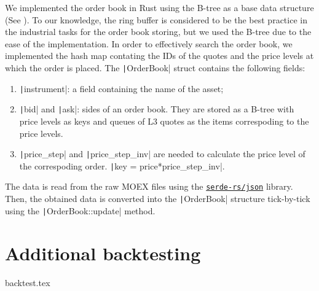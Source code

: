 \begin{appendices}
        We implemented the order book in Rust using the B-tree as a base data structure (See \Cite{Cormen2022}). To our knowledge, 
        the ring buffer is considered to be the best practice in the industrial tasks for the order book storing, but we used 
        the B-tree due to the ease of the implementation.
        In order to effectively search the order book, we implemented the hash map contating the IDs of the quotes and
        the price levels at which the order is placed. The \texttt|OrderBook| struct contains the following fields:
        \begin{enumerate}
            \item \texttt|instrument|: a field containing the name of the asset;
            \item \texttt|bid| and \texttt|ask|: sides of an order book. They are 
                stored as a B-tree with price levels as keys and queues of L3 quotes as the items correspoding
                to the price levels.
            \item \texttt|price_step| and \texttt|price_step_inv| are needed to calculate the 
                price level of the correspoding order. \texttt|key = price*price_step_inv|.
        \end{enumerate}
        The data is read from the raw MOEX files using the \href{github.com/serde-rs/json}{\texttt{serde-rs/json}} library. Then, the obtained data is
        converted into the \texttt|OrderBook| structure tick-by-tick using the \texttt|OrderBook::update| method.

    \section{Additional backtesting}
        {backtest.tex}
\end{appendices}   %